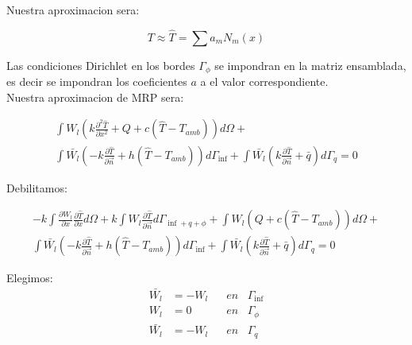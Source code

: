 \documentclass{article}
\begin{document}
\begin{enumerate}[1)]
{        Nuestra aproximacion sera:

        \begin{equation}
            T \approx \hat{T} = \sum{ a_m N_m\left(x\right)}
        \end{equation}

        Las condiciones Dirichlet en los bordes $\Gamma_{\phi}$ se impondran en la matriz ensamblada, es decir se impondran los 
        coeficientes $a$ a el valor correspondiente.\\

        Nuestra aproximacion de MRP sera:

        \begin{align*}
            \int{W_l \left( k \frac{\partial^2 \hat{T}}{\partial x^2} + Q + c\left(\hat{T}-T_{amb}\right) \right) d\Omega} +\\
             \int{ \bar{W_l} \left( -k\frac{\partial \hat{T}}{\partial \vec{n}} + h\left(\hat{T}-T_{amb}\right) \right) d\Gamma_{\inf}} + \int{\bar{W_l} \left(k\frac{\partial \hat{T}}{\partial \vec{n}}+ \bar{q} \right) d\Gamma_{q}}= 0
        \end{align*}

        Debilitamos:

        \begin{align*}
            - k\int{ \frac{\partial W_l}{\partial x} \frac{\partial \hat{T}}{\partial x} d\Omega} + k\int{ W_l \frac{\partial \hat{T}}{\partial \vec{n}} d\Gamma_{\inf+q+\phi}} + \int{W_l \left( Q + c\left(\hat{T}-T_{amb}\right) \right) d\Omega} +\\
            \int{ \bar{W_l} \left( -k\frac{\partial \hat{T}}{\partial \vec{n}} + h\left(\hat{T}-T_{amb}\right) \right) d\Gamma_{\inf}} + \int{\bar{W_l} \left(k\frac{\partial \hat{T}}{\partial \vec{n}}+ \bar{q} \right) d\Gamma_{q}} = 0
        \end{align*}

        Elegimos: 
        \begin{align*}
            \bar{W_l} &= -W_l \hspace{10pt} &en \hspace{10pt} \Gamma_{\inf}\\
            W_l       &= 0	  \hspace{10pt} &en \hspace{10pt} \Gamma_{\phi}\\
            \bar{W_l} &= -W_l \hspace{10pt} &en \hspace{10pt} \Gamma_{q}\\
        \end{align*}

}
\end{enumerate}
\end{document}
